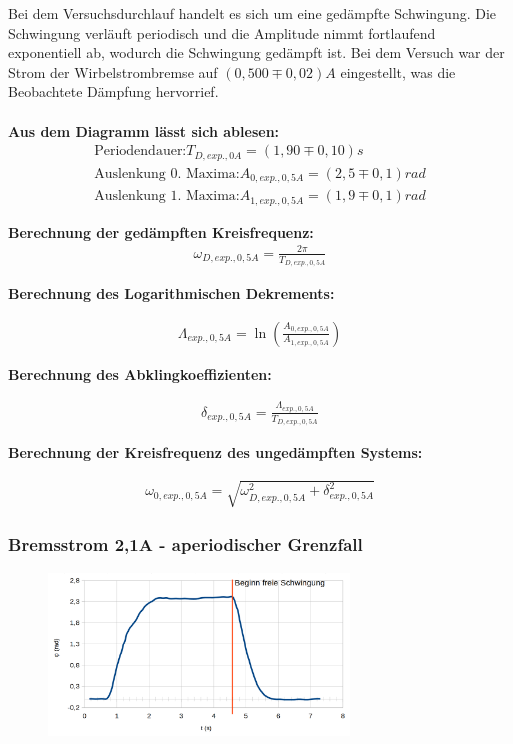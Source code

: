 \documentclass[a4paper]{scrartcl}
\numberwithin{equation}{subsection}
\begin{document}
Bei dem Versuchsdurchlauf handelt es sich um eine gedämpfte Schwingung. Die Schwingung verläuft periodisch und die Amplitude nimmt fortlaufend exponentiell ab, wodurch die Schwingung gedämpft ist. Bei dem Versuch war der Strom der Wirbelstrombremse auf $(0,500\mp0,02)A$ eingestellt, was die Beobachtete Dämpfung hervorrief.
\\ \\
\textbf{Aus dem Diagramm lässt sich ablesen:}
\begin{align*}
\text{Periodendauer:} T_{D,\textit{exp.},0A} = (1,90\mp0,10)s \\
\text{Auslenkung 0. Maxima:} A_{0,\textit{exp.},0,5A} = (2,5\mp0,1)rad \\
\text{Auslenkung 1. Maxima:} A_{1,\textit{exp.},0,5A} = (1,9\mp0,1)rad
\end{align*}

\textbf{Berechnung der gedämpften Kreisfrequenz:}
\begin{align}
\omega_{D,\textit{exp.},0,5A} = \frac{2\pi}{T_{D,\textit{exp.},0,5A}}
\end{align}

\textbf{Berechnung des Logarithmischen Dekrements:}

\begin{align}
\Lambda_{\textit{exp.},0,5A} = \ln(\frac{A_{0,\textit{exp.},0,5A}}{A_{1,\textit{exp.},0,5A}})
\end{align}

\textbf{Berechnung des Abklingkoeffizienten:}

\begin{align}
\delta_{\textit{exp.},0,5A} = \frac{\Lambda_{\textit{exp.},0,5A}}{T_{D,\textit{exp.},0,5A}}
\end{align}

\textbf{Berechnung der Kreisfrequenz des ungedämpften Systems:}

\begin{align}
\omega_{0,\textit{exp.},0,5A} = \sqrt{\omega_{D,\textit{exp.},0,5A}^2 + \delta_{\textit{exp.},0,5A}^2}
\end{align}

\subsubsection{Bremsstrom 2,1A - aperiodischer Grenzfall}

\begin{figure}[H]
\includegraphics[width=8cm]{Messung_Rad_graph_21A}
\centering
\end{figure}
\end{document}
